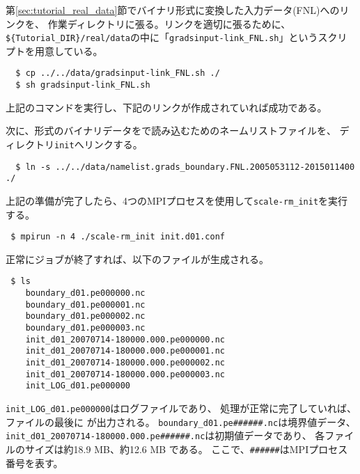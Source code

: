 第\ref{sec:tutorial_real_data}節でバイナリ形式に変換した入力データ(FNL)へのリンクを、
作業ディレクトリに張る。リンクを適切に張るために、\verb|${Tutorial_DIR}/real/data|の中に「\verb|gradsinput-link_FNL.sh|」というスクリプトを用意している。
\begin{verbatim}
  $ cp ../../data/gradsinput-link_FNL.sh ./
  $ sh gradsinput-link_FNL.sh
\end{verbatim}
上記のコマンドを実行し、下記のリンクが作成されていれば成功である。

次に、{\grads}形式のバイナリデータを{\scalelib}で読み込むためのネームリストファイルを、
ディレクトリ\verb|init|へリンクする。
\begin{verbatim}
  $ ln -s ../../data/namelist.grads_boundary.FNL.2005053112-2015011400 ./
\end{verbatim}
%
上記の準備が完了したら、4つのMPIプロセスを使用して\verb|scale-rm_init|を実行する。
\begin{verbatim}
 $ mpirun -n 4 ./scale-rm_init init.d01.conf
\end{verbatim}

正常にジョブが終了すれば、以下のファイルが生成される。
\begin{verbatim}
 $ ls
    boundary_d01.pe000000.nc
    boundary_d01.pe000001.nc
    boundary_d01.pe000002.nc
    boundary_d01.pe000003.nc
    init_d01_20070714-180000.000.pe000000.nc
    init_d01_20070714-180000.000.pe000001.nc
    init_d01_20070714-180000.000.pe000002.nc
    init_d01_20070714-180000.000.pe000003.nc
    init_LOG_d01.pe000000
\end{verbatim}
\verb|init_LOG_d01.pe000000|はログファイルであり、
処理が正常に完了していれば、ファイルの最後に
が出力される。
\verb|boundary_d01.pe######.nc|は境界値データ、
\verb|init_d01_20070714-180000.000.pe######.nc|は初期値データであり、
各ファイルのサイズは約18.9 MB、約12.6 MB である。
ここで、\verb|######|はMPIプロセス番号を表す。\\

